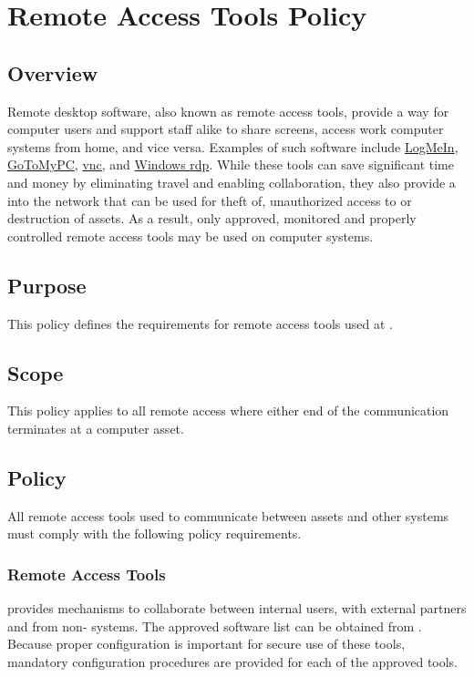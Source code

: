 \chapter{Remote Access Tools Policy}
\CommonIntroduction
\section{Overview}
Remote desktop software, also known as remote access tools, provide a way for computer users and support staff alike to share screens, access work computer systems from home, and vice versa.  
Examples of such software include \href{https://secure.logmein.com/home/en}{LogMeIn}, \href{https://get.gotomypc.com/}{GoToMyPC}, \href{https://en.wikipedia.org/wiki/Virtual_Network_Computing}{\gls{vnc}}, and \href{https://msdn.microsoft.com/en-us/library/aa383015(v=vs.85).aspx}{Windows \gls{rdp}}.  
While these tools can save significant time and money by eliminating travel and enabling collaboration, they also provide a \backdoor{} into the \CompanyName{} network that can be used for theft of, unauthorized access to\oxford{} or destruction of assets.  
As a result, only approved, monitored\oxford{} and properly controlled remote access tools may be used on \CompanyName{} computer systems.

\section{Purpose}
This policy defines the requirements for remote access tools used at \CompanyName{}.
\section{Scope}
This policy applies to all remote access where either end of the communication terminates at a \CompanyName{} computer asset.
\section{Policy}
All remote access tools used to communicate between \CompanyName{} assets and other systems must comply with the following policy requirements.

\subsection{Remote Access Tools}
\CompanyName{} provides mechanisms to collaborate between internal users, with external partners\oxford{} and from non-\CompanyName{} systems.  
The approved software list can be obtained from .  
Because proper configuration is important for secure use of these tools, mandatory configuration procedures are provided for each of the approved tools.

